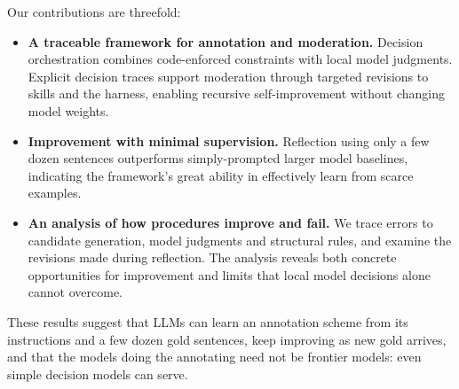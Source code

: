 Our contributions are threefold:
\begin{itemize}[leftmargin=*,itemsep=2pt,topsep=2pt]
\item \textbf{A traceable framework for annotation and moderation.}
Decision orchestration combines code-enforced constraints with local model judgments. Explicit decision traces support moderation through targeted revisions to skills and the harness, enabling recursive self-improvement without changing model weights.

\item \textbf{Improvement with minimal supervision.}
Reflection using only a few dozen sentences outperforms simply-prompted larger model baselines, indicating the framework's great ability in effectively learn from scarce examples.

\item \textbf{An analysis of how procedures improve and fail.}
We trace errors to candidate generation, model judgments and structural rules, and examine the revisions made during reflection. The analysis reveals both concrete opportunities for improvement and limits that local model decisions alone cannot overcome.
\end{itemize}





These results suggest that LLMs can learn an annotation scheme from its instructions and a few dozen gold sentences, keep improving as new gold arrives, and that the models doing the annotating need not be frontier models: even simple decision models can serve.
